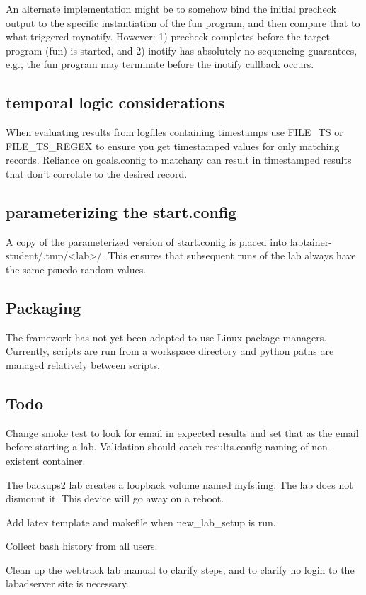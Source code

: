 \documentclass[12pt]{article}
\begin{document}
An alternate implementation might be to somehow bind the initial precheck output to the specific instantiation of
the fun program, and then compare that to what triggered mynotify.  However: 1) precheck completes before the target
program (fun) is started, and 2) inotify has absolutely no sequencing guarantees, e.g., the fun program may terminate
before the inotify callback occurs.

\subsection {temporal logic considerations}
When evaluating results from logfiles containing timestamps use FILE\_TS or FILE\_TS\_REGEX
to ensure you get timestamped values for only matching records. Reliance on goals.config to
matchany can result in timestamped results that don't corrolate to the desired record. 

\subsection {parameterizing the start.config}
A copy of the parameterized version of start.config is placed into 
labtainer-student/.tmp/<lab>/.  This ensures that subsequent runs of the lab always
have the same psuedo random values.

\subsection {Packaging}
The framework has not yet been adapted to use Linux package managers.
Currently, scripts are run from a workspace directory and python
paths are managed relatively between scripts.  

\subsection{Todo}
Change smoke test to look for email in expected results and set that as the email before starting a lab.
Validation should catch results.config naming of non-existent container.

The backups2 lab creates a loopback volume named myfs.img.  The lab does not dismount it.
This device will go away on a reboot.

Add latex template and makefile when new\_lab\_setup is run.

Collect bash history from all users.

Clean up the webtrack lab  manual to clarify steps, and to clarify no login to the labadserver site 
is necessary.
\end{document}
